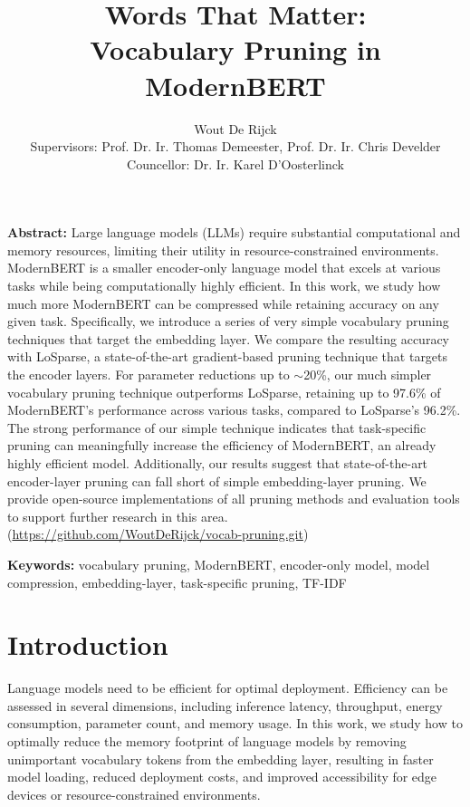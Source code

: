 \documentclass[twocolumn]{article}
\title{\vspace{-1.5cm}\huge Words That Matter:\\ Vocabulary Pruning in ModernBERT}
\author{
Wout De Rijck\\[0.5em]
\small{Supervisors:} \normalsize Prof. Dr. Ir. Thomas Demeester, \normalsize Prof. Dr. Ir. Chris Develder\\
\small{Councellor:} \normalsize Dr. Ir. Karel D'Oosterlinck
}
\date{} %
\begin{document}
\maketitle


\textbf{Abstract:} Large language models (LLMs) require substantial computational and memory resources, limiting their utility in resource-constrained environments. 
ModernBERT is a smaller encoder-only language model that excels at various tasks while being computationally highly efficient. 
In this work, we study how much more ModernBERT can be compressed while retaining accuracy on any given task.
Specifically, we introduce a series of very simple vocabulary pruning techniques that target the embedding layer. We compare the resulting accuracy with LoSparse, a state-of-the-art gradient-based pruning technique that targets the encoder layers.
For parameter reductions up to $\sim$20\%, our much simpler vocabulary pruning technique outperforms LoSparse, retaining up to 97.6\% of ModernBERT's performance across various tasks, compared to LoSparse's 96.2\%.
The strong performance of our simple technique indicates that task-specific pruning can meaningfully increase the efficiency of ModernBERT, an already highly efficient model. Additionally, our results suggest that state-of-the-art encoder-layer pruning can fall short of simple embedding-layer pruning.
We provide open-source implementations of all pruning methods and evaluation tools to support further research in this area. (\url{https://github.com/WoutDeRijck/vocab-pruning.git})

\textbf{Keywords:} vocabulary pruning, ModernBERT, encoder-only model, model compression, embedding-layer, task-specific pruning, TF-IDF

\section{Introduction}
Language models need to be efficient for optimal deployment.
Efficiency can be assessed in several dimensions, including inference latency, throughput, energy consumption, parameter count, and memory usage\cite{yuan2025efficientllm}.
In this work, we study how to optimally reduce the memory footprint of language models by removing unimportant vocabulary tokens from the embedding layer, resulting in faster model loading, reduced deployment costs, and improved accessibility for edge devices or resource-constrained environments.
\end{document}
